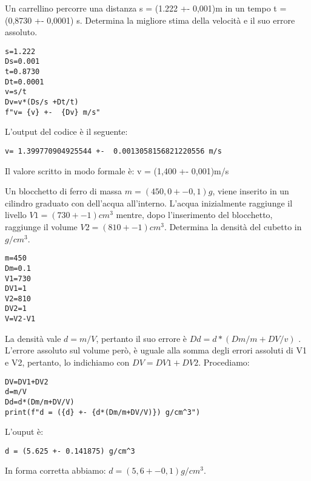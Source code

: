 \begin{testexample}
Un carrellino percorre una distanza s = (1.222 +- 0,001)m in un tempo t = (0,8730 +- 0,0001) s. Determina la migliore stima della velocità e il suo errore assoluto.

\begin{verbatim}
s=1.222
Ds=0.001
t=0.8730
Dt=0.0001
v=s/t
Dv=v*(Ds/s +Dt/t)
f"v= {v} +-  {Dv} m/s"
\end{verbatim}
L'output del codice è il seguente:
\begin{verbatim}
v= 1.399770904925544 +-  0.0013058156821220556 m/s
\end{verbatim}
Il valore scritto in modo formale è: v = (1,400 +- 0,001)m/s
\end{testexample}

\begin{testexample}
Un blocchetto di ferro di massa $m = (450,0 +- 0,1) g$, viene inserito in un cilindro graduato con dell'acqua all'interno. L'acqua inizialmente raggiunge il livello $V1 = ( 730 +- 1) cm^3$ mentre, dopo l'inserimento del blocchetto, raggiunge il volume $V2= (810 +-1 ) cm^3$. Determina la densità del cubetto in $g/cm^3$.
\begin{verbatim}
m=450
Dm=0.1
V1=730
DV1=1
V2=810
DV2=1
V=V2-V1
\end{verbatim}
La densità vale $d = m/V$, pertanto il suo errore è $Dd = d*(Dm/m + DV/v)$ . L'errore assoluto sul volume però, è uguale alla somma degli errori assoluti di V1 e V2, pertanto, lo indichiamo con $DV = DV1+DV2$. Procediamo:
\begin{verbatim}
DV=DV1+DV2
d=m/V
Dd=d*(Dm/m+DV/V)
print(f"d = ({d} +- {d*(Dm/m+DV/V)}) g/cm^3")
\end{verbatim}
L'ouput è:
\begin{verbatim}
d = (5.625 +- 0.141875) g/cm^3
\end{verbatim}
In forma corretta abbiamo: $d = (5,6 +- 0,1) g/cm^3$.

\end{testexample}

